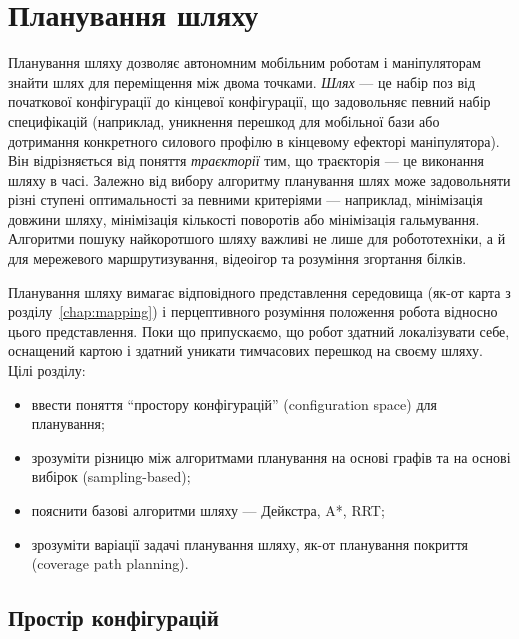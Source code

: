 \chapter{Планування шляху}\label{chap:pathplanning}

Планування шляху дозволяє автономним мобільним роботам і маніпуляторам знайти шлях для переміщення між двома точками.
\emph{Шлях} — це набір поз від початкової конфігурації до кінцевої конфігурації, що задовольняє певний набір специфікацій (наприклад, уникнення перешкод для мобільної бази або дотримання конкретного силового профілю в кінцевому ефекторі маніпулятора). Він відрізняється від поняття \emph{траєкторії} тим, що траєкторія — це виконання шляху в часі.
Залежно від вибору алгоритму планування шлях може задовольняти різні ступені оптимальності за певними критеріями — наприклад, мінімізація довжини шляху, мінімізація кількості поворотів або мінімізація гальмування.
Алгоритми пошуку найкоротшого шляху важливі не лише для робототехніки, а й для мережевого маршрутизування, відеоігор та розуміння згортання білків.

Планування шляху вимагає відповідного представлення середовища (як-от карта з розділу~\ref{chap:mapping}) і перцептивного розуміння положення робота відносно цього представлення. Поки що припускаємо, що робот здатний локалізувати себе, оснащений картою і здатний уникати тимчасових перешкод на своєму шляху. Цілі розділу:

\begin{itemize}
\item ввести поняття ``простору конфігурацій'' (configuration space) для планування;
\item зрозуміти різницю між алгоритмами планування на основі графів та на основі вибірок (sampling-based);
\item пояснити базові алгоритми шляху — Дейкстра, A*, RRT;
\item зрозуміти варіації задачі планування шляху, як-от планування покриття (coverage path planning).
\end{itemize}

\section{Простір конфігурацій}

